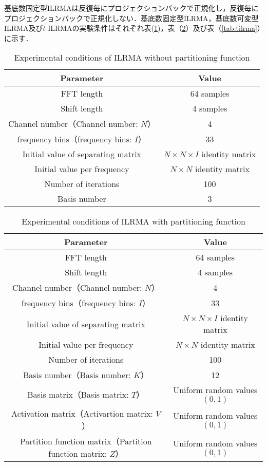 基底数固定型ILRMAは反復毎にプロジェクションバックで正規化し，反復毎にプロジェクションバックで正規化しない．基底数固定型ILRMA，基底数可変型ILRMA及び$t$-ILRMAの実験条件はそれぞれ表(\ref{tab:fixedilrma})，表（\ref{tab:variableilrma}）及び表（\ref{tab:tilrma}）に示す．
\begin{table}[t]
  \caption{Experimental conditions of ILRMA without partitioning function}
  \centering
  \begin{tabular}{cc} \hline
    Parameter & Value \\ \hline \hline
    FFT length & 64 samples  \\ \hline
    Shift length & 4 samples \\ \hline
    Channel number（Channel number: $N$） & 4 \\ \hline
    frequency bins（frequency bins: $I$） & 33 \\ \hline
    Initial value of separating matrix & $N \times N \times I$ identity matrix  \\ \hline
    Initial value per frequency & $N \times N$ identity matrix  \\ \hline
    Number of iterations & 100\\ \hline
    Basis number & 3 \\ \hline \hline
  \end{tabular}
  \label{tab:fixedilrma}
\end{table}
\begin{table}[t]
  \caption{Experimental conditions of ILRMA with partitioning function}
  \centering
  \begin{tabular}{cc} \hline
    Parameter & Value \\ \hline \hline
    FFT length & 64 samples  \\ \hline
    Shift length & 4 samples \\ \hline
    Channel number（Channel number: $N$） & 4 \\ \hline
    frequency bins（frequency bins: $I$） & 33 \\ \hline 
    Initial value of separating matrix & $N \times N \times I$ identity matrix  \\ \hline
    Initial value per frequency & $N \times N$ identity matrix  \\ \hline
    Number of iterations & 100\\ \hline
    Basis number（Basis number: $K$） & 12 \\ \hline
    Basis matrix（Basis matrix: $T$） & Uniform random values $(0,1)$ \\ \hline
    Activation matrix（Activartion matrix: $V$） & Uniform random values $(0,1)$ \\ \hline 
    Partition function matrix（Partition function matrix: $Z$） & Uniform random values $(0,1)$ \\ \hline \hline
  \end{tabular}
  \label{tab:variableilrma}
\end{table}
